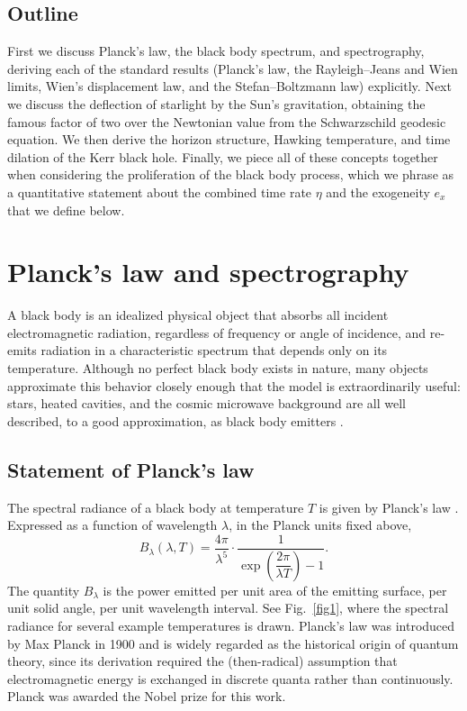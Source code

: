 \documentclass[10pt]{article}
\theoremstyle{definition}
\theoremstyle{remark}
\begin{document}
\subsection{Outline}

First we discuss Planck's law, the black body spectrum, and spectrography, deriving each of the standard results (Planck's law, the Rayleigh--Jeans and Wien limits, Wien's displacement law, and the Stefan--Boltzmann law) explicitly. Next we discuss the deflection of starlight by the Sun's gravitation, obtaining the famous factor of two over the Newtonian value from the Schwarzschild geodesic equation. We then derive the horizon structure, Hawking temperature, and time dilation of the Kerr black hole. Finally, we piece all of these concepts together when considering the proliferation of the black body process, which we phrase as a quantitative statement about the combined time rate $\eta$ and the exogeneity $e_x$ that we define below.




\section{Planck's law and spectrography}

A black body is an idealized physical object that absorbs all incident electromagnetic radiation, regardless of frequency or angle of incidence, and re-emits radiation in a characteristic spectrum that depends only on its temperature. Although no perfect black body exists in nature, many objects approximate this behavior closely enough that the model is extraordinarily useful: stars, heated cavities, and the cosmic microwave background are all well described, to a good approximation, as black body emitters \cite{rybicki}.

\subsection{Statement of Planck's law}

The spectral radiance of a black body at temperature $T$ is given by Planck's law \cite{planck}. Expressed as a function of wavelength $\lambda$, in the Planck units fixed above,
\begin{equation}\label{eq:planck-lambda}
B_\lambda(\lambda, T) = \frac{4 \pi}{\lambda^5} \cdot \frac{1}{\exp\!\left(\dfrac{2 \pi}{\lambda T}\right) - 1}.
\end{equation}
The quantity $B_\lambda$ is the power emitted per unit area of the emitting surface, per unit solid angle, per unit wavelength interval. See Fig.~\ref{fig1}, where the spectral radiance for several example temperatures is drawn. Planck's law was introduced by Max Planck in 1900 and is widely regarded as the historical origin of quantum theory, since its derivation required the (then-radical) assumption that electromagnetic energy is exchanged in discrete quanta rather than continuously. Planck was awarded the Nobel prize for this work.
\end{document}
